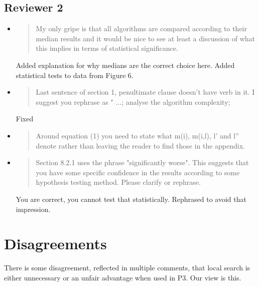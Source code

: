 \documentclass[]{article}
\begin{document}
\subsection{Reviewer 2}
\begin{itemize}

\item
\begin{quote}
My only gripe is that all algorithms are compared according to their median results and it would be nice to see at least a discussion of what this implies in terms of statistical significance.
\end{quote}

Added explanation for why medians are the correct choice here. Added statistical tests to data from Figure 6.

\item
\begin{quote}
Last sentence of section 1, penultimate clause doesn't have  verb in it. I suggest you rephrase as " ...; analyse the algorithm complexity; 
\end{quote}

Fixed

\item
\begin{quote}
Around equation (1) you need to state what m(i), m(i,l), l' and l'' denote rather than leaving the reader to find those in the appendix.
\end{quote}

\item
\begin{quote}
Section 8.2.1 uses the phrase "significantly worse".  This suggests that you have some specific confidence in the results according to some hypothesis testing method.  Please clarify or rephrase.
\end{quote}

You are correct, you cannot test that statistically. Rephrased to avoid that impression.

\end{itemize}

\section{Disagreements}

There is some disagreement, reflected in multiple comments, that local search is either unnecessary or an unfair advantage when used in P3. Our view is this.
\end{document}
